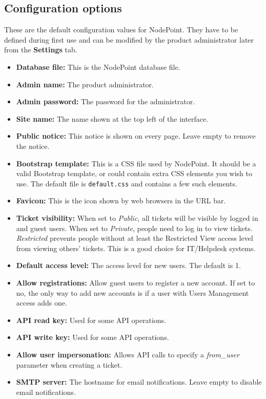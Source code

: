 \documentclass[11pt]{article}
\begin{document}
\subsection{Configuration options}

These are the default configuration values for NodePoint. They have to be defined during first use and can be modified by the product administrator later from the \textbf{Settings} tab.

\begin{itemize}
\item \textbf{Database file:} This is the NodePoint database file.
\item \textbf{Admin name:} The product administrator.
\item \textbf{Admin password:} The password for the administrator.
\item \textbf{Site name:} The name shown at the top left of the interface.
\item \textbf{Public notice:} This notice is shown on every page. Leave empty to remove the notice.
\item \textbf{Bootstrap template:} This is a CSS file used by NodePoint. It should be a valid Bootstrap template, or could contain extra CSS elements you wish to use. The default file is \texttt{default.css} and contains a few such elements.
\item \textbf{Favicon:} This is the icon shown by web browsers in the URL bar.
\item \textbf{Ticket visibility:} When set to \textit{Public}, all tickets will be visible by logged in and guest users. When set to \textit{Private}, people need to log in to view tickets. \textit{Restricted} prevents people without at least the Restricted View access level from viewing others' tickets. This is a good choice for IT/Helpdesk systems.
\item \textbf{Default access level:} The access level for new users. The default is 1.
\item \textbf{Allow registrations:} Allow guest users to register a new account. If set to no, the only way to add new accounts is if a user with Users Management access adds one.
\item \textbf{API read key:} Used for some API operations.
\item \textbf{API write key:} Used for some API operations.
\item \textbf{Allow user impersonation:} Allows API calls to specify a \textit{from\_user} parameter when creating a ticket.
\item \textbf{SMTP server:} The hostname for email notifications. Leave empty to disable email notifications.

\end{itemize}
\end{document}

